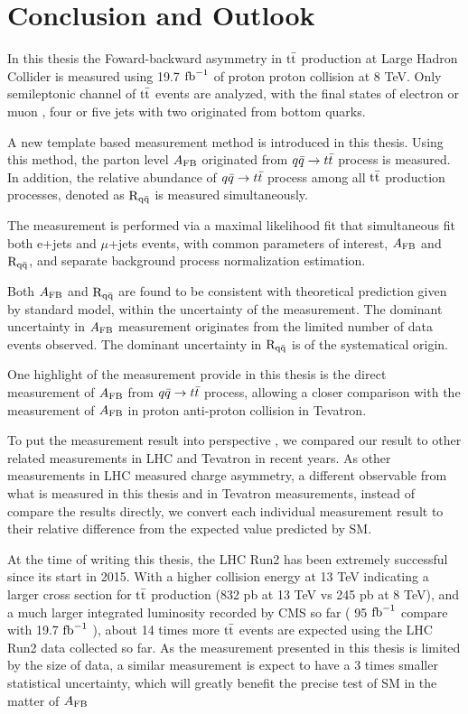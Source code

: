 \chapter*{Conclusion and Outlook}

In this thesis the Foward-backward asymmetry in $\mathrm{t}\bar{\mathrm{t}}$ production at Large Hadron Collider is measured using 19.7 $\text{fb}^{-1}$ of proton proton collision at 8 TeV. Only semileptonic channel of $\mathrm{t}\bar{\mathrm{t}}$ events are analyzed, with the final states of electron or muon , four or five jets with two originated from bottom quarks. 

A new template based measurement method is introduced in this thesis. Using this method, the parton level $A_{\mathrm{FB}}$ originated from $q\bar q \rightarrow t \bar t$ process is measured. In addition, the relative abundance of $q\bar q \rightarrow t \bar t$ process among all $\mathrm{t}\bar{\mathrm{t}}$ production processes, denoted as $\mathrm{R_{\mathrm{q \bar{q}}}}$ is measured simultaneously. 

The measurement is performed via a maximal likelihood fit that simultaneous fit both e+jets and $\mu$+jets events, with common parameters of interest, $A_{\mathrm{FB}}$ and $\mathrm{R_{\mathrm{q \bar{q}}}}$, and separate background process normalization estimation. 

Both $A_{\mathrm{FB}}$ and $\mathrm{R_{\mathrm{q \bar{q}}}}$ are found to be consistent with theoretical prediction given by standard model, within the uncertainty of the measurement. The dominant uncertainty in $A_{\mathrm{FB}}$ measurement originates from the limited number of data events observed. The dominant uncertainty in $\mathrm{R_{\mathrm{q \bar{q}}}}$ is of the systematical origin. 

One highlight of the measurement provide in this thesis is the direct measurement of $A_{\mathrm{FB}}$ from $q\bar q \rightarrow t \bar t$ process, allowing a closer comparison with the measurement of $A_{\mathrm{FB}}$ in proton anti-proton collision in Tevatron.

To put the measurement result into perspective , we compared our result to other related measurements in LHC and Tevatron in recent years. As other measurements in LHC measured charge asymmetry, a different observable from what is measured in this thesis and in Tevatron measurements, instead of compare the results directly, we convert each individual measurement result to their relative difference from the expected value predicted by SM.

At the time of writing this thesis, the LHC Run2 has been extremely successful since its start in 2015. With a higher collision energy at 13 TeV indicating a larger cross section for $\mathrm{t}\bar{\mathrm{t}}$ production (832 pb at 13 TeV vs 245 pb at 8 TeV), and a much larger integrated luminosity recorded by CMS so far ( 95 $\text{fb}^{-1}$ compare with 19.7 $\text{fb}^{-1}$ ), about 14 times more $\mathrm{t}\bar{\mathrm{t}}$ events are expected using the LHC Run2 data collected so far. As the measurement presented in this thesis is limited by the size of data, a similar measurement is expect to have a 3 times smaller statistical uncertainty, which will greatly benefit the precise test of SM in the matter of $A_{\mathrm{FB}}$

